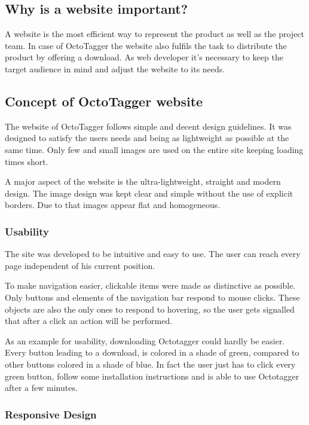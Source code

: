 \subsection{Why is a website important?}

A website is the most efficient way to represent the product as well as the project team. In case of OctoTagger the website also fulfils the task to distribute the product by offering a download. As web developer it's necessary to keep the target audience in mind and adjust the website to its needs.

\subsection{Concept of OctoTagger website}

The website of OctoTagger follows simple and decent design guidelines. It was designed to satisfy the users needs and being as lightweight as possible at the same time. Only few and small images are used on the entire site keeping loading times short.

A major aspect of the website is the ultra-lightweight, straight and modern design. The image design was kept clear and simple without the use of explicit borders. Due to that images appear flat and homogeneous.

\subsubsection{Usability}

The site was developed to be intuitive and easy to use. The user can reach every page independent of his current position.

To make navigation easier, clickable items were made as distinctive as possible. Only buttons and elements of the navigation bar respond to mouse clicks. These objects are also the only ones to respond to hovering, so the user gets signalled that after a click an action will be performed.

As an example for usability, downloading Octotagger could hardly be easier. Every button leading to a download, is colored in a shade of green, compared to other buttons colored in a shade of blue. In fact the user just has to click every green button, follow some installation instructions and is able to use Octotagger after a few minutes.

\subsubsection{Responsive Design}

